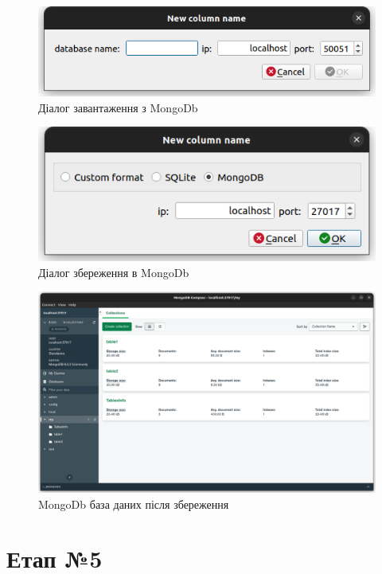 \documentclass[a4paper, 12pt]{article}
\begin{document}
\begin{figure}[H]
\centering
\includegraphics[scale=0.8]{resources/MongoDbLoadDialog.png}
\caption{Діалог завантаження з MongoDb}
\end{figure} 

\begin{figure}[H]
\centering
\includegraphics[scale=0.8]{resources/MongoDbSaveDialog.png}
\caption{Діалог збереження в MongoDb}
\end{figure} 

\begin{figure}[H]
\centering
\includegraphics[scale=0.3]{resources/MongoDb.png}
\caption{MongoDb база даних після збереження}
\end{figure} 

\section{Етап №5}
\end{document}
